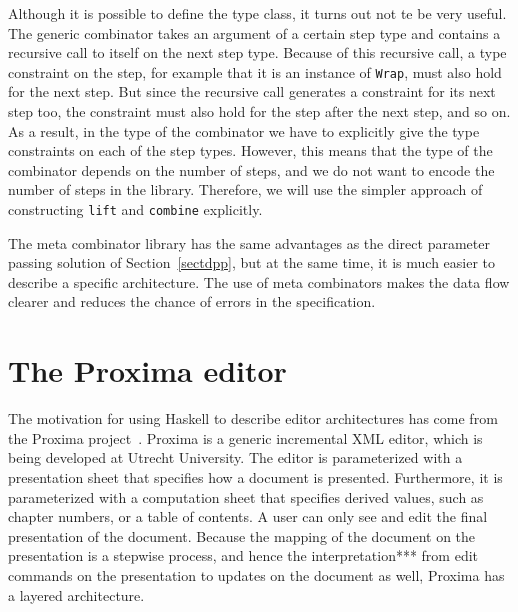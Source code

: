 Although it is possible to define the type class, it turns out not te be very useful. The generic combinator takes an argument of a certain step type and contains a recursive call to itself on the next step type. Because of this recursive call, a type constraint on the step, for example that it is an instance of \texttt{Wrap}, must also hold for the next step. But since the recursive call generates a constraint for its next step too, the constraint must also hold for the step after the next step, and so on. As a result, in the type of the combinator we have to explicitly give the type constraints on each of the step types. However, this means that the type of the combinator depends on the number of steps, and we do not want to encode the number of steps in the library. Therefore, we will use the simpler approach of constructing \texttt{lift} and \texttt{combine} explicitly.

The meta combinator library has the same advantages as the direct parameter passing solution of Section~\ref{sectdpp}, but at the same time, it is much easier to describe a specific architecture. The use of meta combinators makes the data flow clearer and reduces the chance of errors in the specification.


%																
%																
%																
\section{The Proxima editor} \label{sectproxima}

The motivation for using Haskell to describe editor architectures has come from the Proxima project~\cite{proxima}. Proxima is a generic incremental XML editor, which is being developed at Utrecht University. The editor is parameterized with a presentation sheet that specifies how a document is presented. Furthermore, it is parameterized with a computation sheet that specifies derived values, such as chapter numbers, or a table of contents. A user can only see and edit the final presentation of the document. Because the mapping of the document on the presentation is a stepwise process, and hence the interpretation*** from edit commands on the presentation to updates on the document as well, Proxima has a layered architecture.

